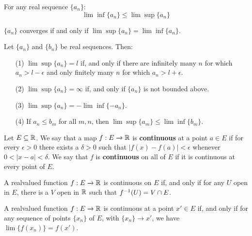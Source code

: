 \begin{lemma}\label{lemma_4.30}
    For any real sequence $\{a_n\}$:
    \begin{equation*}
        \lim\inf{\{a_n\}} \leq \lim\sup{\{a_n\}}
    \end{equation*}
\end{lemma}
\begin{corollary}
    $\{a_n\}$ converges if and only if $\lim\sup{\{a_n\}}=\lim\inf{\{a_n\}}$.
\end{corollary}

\begin{lemma}\label{lemma_4.31}
    Let $\{a_n\}$ and $\{b_n\}$ be real sequences. Then:
    \begin{enumerate}
        \item[(1)] $\lim\sup{\{a_n\}}=l$ if, and only if there are infinitely
            many $n$ for which  $a_n>l-\epsilon$ and only finitely many  $n$ for
            which $a_n>l+\epsilon$.

        \item[(2)] $\lim\sup{\{a_n\}}=\infty$ if, and only if $\{a_n\}$ is not
            bounded above.

        \item[(3)] $\lim\sup{\{a_n\}}=-\lim\inf{\{-a_n\}}$.

        \item[(4)] If $a_n \leq b_m$ for all  $m,n$, then $\lim\sup{\{a_m\}}
            \leq \lim\inf{\{b_m\}}$.
    \end{enumerate}
\end{lemma}

\begin{definition}
    Let $E \subseteq \mathbb{R}$. We say that a map  $f:E \xrightarrow{} \mathbb{R}$ is
    \textbf{continuous} at a point $a \in E$ if for every  $\epsilon>0$ there
    exists a  $\delta>0$ such that  $|f(x)-f(a)|<\epsilon$ whenever
    $0<|x-a|<\delta$. We say that  $f$ is  \textbf{continuous} on all of $E$ if
    it is continuous at every point of  $E$.
\end{definition}

\begin{theorem}\label{thm_4.32}
    A realvalued function $f:E \xrightarrow{} \mathbb{R}$ is continuous on $E$ if, and
    only if for any $U$ open in $E$, there is a  $V$ open in  $\mathbb{R}$ such that
    $f^{-1}(U)=V \cap E$.
\end{theorem}

\begin{theorem}\label{thm_4.33}
    A realvalued function $f:E \xrightarrow{} \mathbb{R}$ is continuous at a point $x'
    \in E$ if, and only if for any sequence of points  $\{x_n\}$ of $E$, with
    $\{x_n\} \xrightarrow{} x'$, we have $\lim{\{f(x_n)\}}=f(x')$.
\end{theorem}

